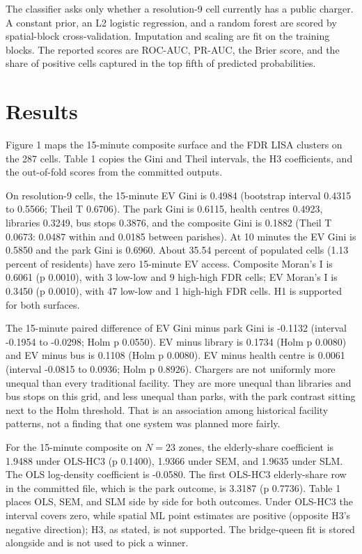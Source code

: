 \documentclass[11pt,a4paper]{article}
\begin{document}
The classifier asks only whether a resolution-9 cell currently has a public charger. A constant prior, an L2 logistic regression, and a random forest are scored by spatial-block cross-validation. Imputation and scaling are fit on the training blocks. The reported scores are ROC-AUC, PR-AUC, the Brier score, and the share of positive cells captured in the top fifth of predicted probabilities.

\section{Results}
Figure 1 maps the 15-minute composite surface and the FDR LISA clusters on the 287 cells. Table 1 copies the Gini and Theil intervals, the H3 coefficients, and the out-of-fold scores from the committed outputs.

On resolution-9 cells, the 15-minute EV Gini is 0.4984 (bootstrap interval 0.4315 to 0.5566; Theil T 0.6706). The park Gini is 0.6115, health centres 0.4923, libraries 0.3249, bus stops 0.3876, and the composite Gini is 0.1882 (Theil T 0.0673: 0.0487 within and 0.0185 between parishes). At 10 minutes the EV Gini is 0.5850 and the park Gini is 0.6960. About 35.54 percent of populated cells (1.13 percent of residents) have zero 15-minute EV access. Composite Moran's I is 0.6061 (p 0.0010), with 3 low-low and 9 high-high FDR cells; EV Moran's I is 0.3450 (p 0.0010), with 47 low-low and 1 high-high FDR cells. H1 is supported for both surfaces.

The 15-minute paired difference of EV Gini minus park Gini is -0.1132 (interval -0.1954 to -0.0298; Holm p 0.0550). EV minus library is 0.1734 (Holm p 0.0080) and EV minus bus is 0.1108 (Holm p 0.0080). EV minus health centre is 0.0061 (interval -0.0815 to 0.0936; Holm p 0.8926). Chargers are not uniformly more unequal than every traditional facility. They are more unequal than libraries and bus stops on this grid, and less unequal than parks, with the park contrast sitting next to the Holm threshold. That is an association among historical facility patterns, not a finding that one system was planned more fairly.

For the 15-minute composite on $N=23$ zones, the elderly-share coefficient is 1.9488 under OLS-HC3 (p 0.1400), 1.9366 under SEM, and 1.9635 under SLM. The OLS log-density coefficient is -0.0580. The first OLS-HC3 elderly-share row in the committed file, which is the park outcome, is 3.3187 (p 0.7736). Table 1 places OLS, SEM, and SLM side by side for both outcomes. Under OLS-HC3 the interval covers zero, while spatial ML point estimates are positive (opposite H3's negative direction); H3, as stated, is not supported. The bridge-queen fit is stored alongside and is not used to pick a winner.
\end{document}

